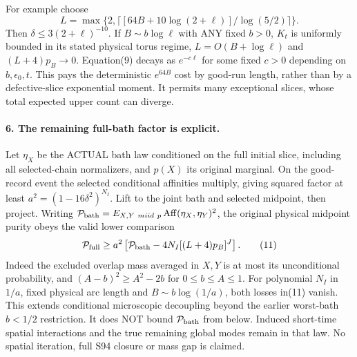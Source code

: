 \documentclass[11pt]{article}
\begin{document}
For example choose
\[
 L=\max\{2,\lceil[64B+10\log(2+\ell)]/\log(5/2)\rceil\}.              \tag{10}
\]
Then $\delta\le3(2+\ell)^{-10}$. If $B\sim b\log\ell$ with ANY fixed
$b>0$, $K_t$ is uniformly bounded in its stated physical torus regime,
$L=O(B+\log\ell)$ and $(L+4)p_B\to0$. Equation(9) decays as $e^{-c\ell}$
for some fixed $c>0$ depending on $b,\epsilon_0,t$. This pays the deterministic
$e^{64B}$ cost by good-run length, rather than by a defective-slice exponential
moment. It permits many exceptional slices, whose total expected upper count
can diverge.

\paragraph{6. The remaining full-bath factor is explicit.}
Let $\eta_X$ be the ACTUAL bath law conditioned on the full initial slice,
including all selected-chain normalizers, and $p(X)$ its original marginal.
On the good-record event the selected conditional affinities multiply, giving
squared factor at least $a^2=(1-16\delta^2)^{N_I}$. Lift to the joint bath and
selected midpoint, then project. Writing
$\mathcal P_{\rm bath}=E_{X,Y\ {
m iid}\ p}\operatorname{Aff}(\eta_X,\eta_Y)^2$,
the original physical midpoint purity obeys the valid lower comparison
\[
 \mathcal P_{\rm full}\ge a^2\left[\mathcal P_{\rm bath}
                   -4N_I[(L+4)p_B]^J\right].                           \tag{11}
\]
Indeed the excluded overlap mass averaged in $X,Y$ is at most its unconditional
probability, and $(A-b)^2\ge A^2-2b$ for $0\le b\le A\le1$.
For polynomial $N_I$ in $1/a$, fixed physical arc length and
$B\sim b\log(1/a)$, both losses in(11) vanish. This extends conditional
microscopic decoupling beyond the earlier worst-bath $b<1/2$ restriction.
It does NOT bound $\mathcal P_{\rm bath}$ from below. Induced short-time spatial
interactions and the true remaining global modes remain in that law. No
spatial iteration, full S94 closure or mass gap is claimed.
\end{document}
